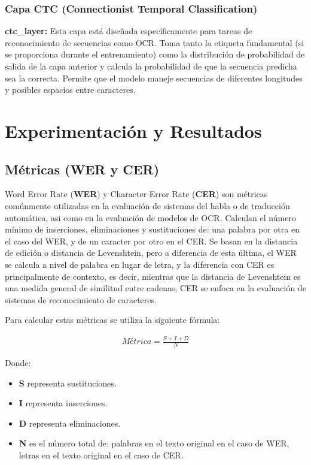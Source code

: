 \documentclass{article}
\begin{document}
\subsubsection{Capa CTC (Connectionist Temporal Classification)}
\textbf{ctc\_layer:} Esta capa está diseñada específicamente para tareas de reconocimiento de secuencias como OCR. Toma tanto la etiqueta fundamental (si se proporciona durante el entrenamiento) como la distribución de probabilidad de salida de la capa anterior y calcula la probabilidad de que la secuencia predicha sea la correcta. Permite que el modelo maneje secuencias de diferentes longitudes y posibles espacios entre caracteres.


\newpage
\section{Experimentación y Resultados}

\subsection{Métricas (WER y CER)}
Word Error Rate (\textbf{WER}) y Character Error Rate (\textbf{CER}) son métricas comúnmente utilizadas en la evaluación de sistemas del habla o de traducción automática, asi como en la evaluación de modelos de OCR. Calculan el número mínimo de inserciones, eliminaciones y sustituciones de: una palabra por otra en el caso del WER, y de un caracter por otro en el CER. Se basan en la distancia de edición o distancia de Levenshtein, pero a diferencia de esta última, el WER se calcula a nivel de palabra en lugar de letra, y la diferencia con CER es principalmente de contexto, es decir, mientras que la distancia de Levenshtein es una medida general de similitud entre cadenas, CER se enfoca en la evaluación de sistemas de reconocimiento de caracteres.

Para calcular estas métricas se utiliza la siguiente fórmula:

\begin{align*}
    Métrica = \frac{S + I + D}{N}
\end{align*}

Donde:
\begin{itemize}
    \item \textbf{S} representa sustituciones.
    \item \textbf{I} representa inserciones.
    \item \textbf{D} representa eliminaciones.
    \item \textbf{N} es el número total de: palabras en el texto original en el caso de WER, letras en el texto original en el caso de CER. 
\end{itemize}
\end{document}

